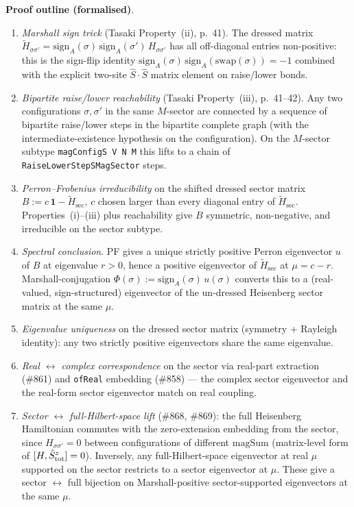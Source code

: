 \documentclass[a4paper,11pt]{article}
\begin{document}
\textbf{Proof outline (formalised)}.
\begin{enumerate}
\item \emph{Marshall sign trick} (Tasaki Property~(ii), p.~41).
  The dressed matrix
  $\widetilde H_{\sigma\sigma'} = \mathrm{sign}_A(\sigma)\,
   \mathrm{sign}_A(\sigma')\,H_{\sigma\sigma'}$ has all
  off-diagonal entries non-positive: this is the sign-flip identity
  $\mathrm{sign}_A(\sigma)\,\mathrm{sign}_A(\mathrm{swap}(\sigma)) = -1$
  combined with the explicit two-site $\hat S \cdot \hat S$ matrix
  element on raise/lower bonds.
\item \emph{Bipartite raise/lower reachability} (Tasaki Property~(iii),
  p.~41–42). Any two configurations $\sigma, \sigma'$ in the same
  $M$-sector are connected by a sequence of bipartite raise/lower
  steps in the bipartite complete graph (with the
  intermediate-existence hypothesis on the configuration). On the
  $M$-sector subtype \texttt{magConfigS V N M} this lifts to a chain
  of \texttt{RaiseLowerStepSMagSector} steps.
\item \emph{Perron--Frobenius irreducibility} on the shifted
  dressed sector matrix
  $B := c\,\mathbf 1 - \widetilde H_{\mathrm{sec}}$, $c$ chosen
  larger than every diagonal entry of $\widetilde H_{\mathrm{sec}}$.
  Properties~(i)--(iii) plus reachability give $B$ symmetric,
  non-negative, and irreducible on the sector subtype.
\item \emph{Spectral conclusion}. PF gives a unique strictly positive
  Perron eigenvector $u$ of $B$ at eigenvalue $r > 0$, hence a
  positive eigenvector of $\widetilde H_{\mathrm{sec}}$ at
  $\mu = c - r$. Marshall-conjugation
  $\Phi(\sigma) := \mathrm{sign}_A(\sigma)\,u(\sigma)$ converts this
  to a (real-valued, sign-structured) eigenvector of the
  un-dressed Heisenberg sector matrix at the same $\mu$.
\item \emph{Eigenvalue uniqueness} on the dressed sector matrix
  (symmetry + Rayleigh identity): any two strictly positive
  eigenvectors share the same eigenvalue.
\item \emph{Real $\leftrightarrow$ complex correspondence} on the
  sector via real-part extraction (\#861) and \texttt{ofReal}
  embedding (\#858) — the complex sector eigenvector and the
  real-form sector eigenvector match on real coupling.
\item \emph{Sector $\leftrightarrow$ full-Hilbert-space lift}
  (\#868, \#869): the full Heisenberg Hamiltonian commutes with the
  zero-extension embedding from the sector, since
  $H_{\sigma\sigma'} = 0$ between configurations of different
  $\mathrm{magSum}$ (matrix-level form of $[H, \hat S^z_{\rm tot}] = 0$).
  Inversely, any full-Hilbert-space eigenvector at real $\mu$
  supported on the sector restricts to a sector eigenvector at $\mu$.
  These give a sector $\leftrightarrow$ full bijection on
  Marshall-positive sector-supported eigenvectors at the same $\mu$.
\end{enumerate}
\end{document}
